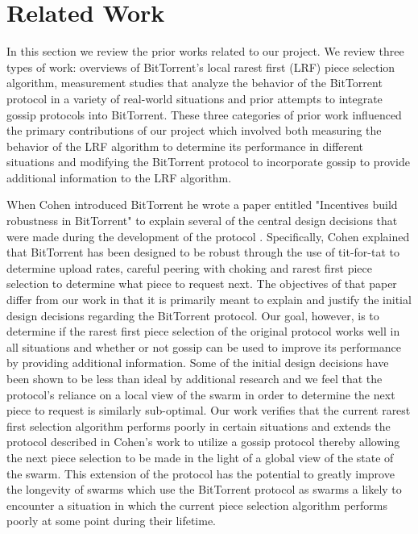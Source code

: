 \section{Related Work}

In this section we review the prior works related to our project. We
review three types of work: overviews of BitTorrent's local rarest first
(LRF) piece selection algorithm, measurement studies that analyze the
behavior of the BitTorrent protocol in a variety of real-world situations
and prior attempts to integrate gossip protocols into BitTorrent. These
three categories of prior work influenced the primary contributions
of our project which involved both measuring the behavior of the LRF
algorithm to determine its performance in different situations and
modifying the BitTorrent protocol to incorporate gossip to provide
additional information to the LRF algorithm.

When Cohen introduced BitTorrent he wrote a paper entitled "Incentives
build robustness in BitTorrent" to explain several of the central
design decisions that were made during the development of the protocol
\cite{cohen:1}. Specifically, Cohen explained that BitTorrent has been designed to be
robust through the use of tit-for-tat to determine upload rates,  careful
peering with choking and rarest first piece selection to determine what
piece to request next. The objectives of that paper differ from our work
in that it is primarily meant to explain and justify the initial design
decisions regarding the BitTorrent protocol. Our goal, however,  is to
determine if the rarest first piece selection of the original protocol
works well in all situations and whether or not gossip can be used to
improve its performance by providing additional information. Some of
the initial design decisions have been shown to be less than ideal by
additional research \cite{levin} \cite{bittyrant} and  we feel that the protocol's reliance
on a local view of the swarm in order to determine the next piece to
request is similarly sub-optimal. Our work verifies that the current
rarest first selection algorithm performs poorly in certain situations
and extends the protocol described in Cohen's work to utilize a gossip
protocol thereby allowing the next piece selection to be made in the
light of a global view of the state of the swarm. This extension of the
protocol has the potential to greatly improve the longevity of swarms
which use the BitTorrent protocol as swarms a likely to encounter a
situation in which the current piece selection algorithm performs poorly
at some point during their lifetime.


